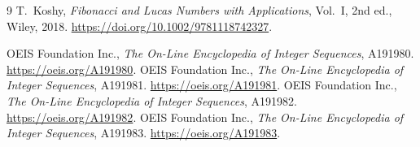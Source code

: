 \documentclass[11pt]{article}
\begin{document}
\begin{thebibliography}{9}
 T.~Koshy, \emph{Fibonacci and Lucas Numbers with Applications},
Vol.~I, 2nd ed., Wiley, 2018.
\url{https://doi.org/10.1002/9781118742327}.

 OEIS Foundation Inc.,
\emph{The On-Line Encyclopedia of Integer Sequences}, A191980.
\url{https://oeis.org/A191980}.
 OEIS Foundation Inc.,
\emph{The On-Line Encyclopedia of Integer Sequences}, A191981.
\url{https://oeis.org/A191981}.
 OEIS Foundation Inc.,
\emph{The On-Line Encyclopedia of Integer Sequences}, A191982.
\url{https://oeis.org/A191982}.
 OEIS Foundation Inc.,
\emph{The On-Line Encyclopedia of Integer Sequences}, A191983.
\url{https://oeis.org/A191983}.
\end{thebibliography}
\end{document}
